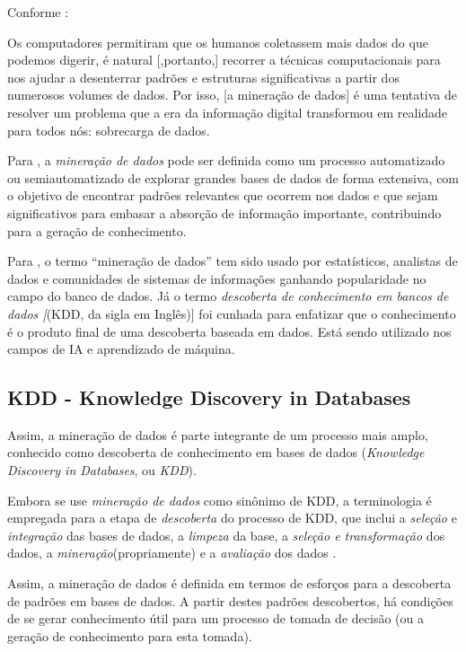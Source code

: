 Conforme :
\begin{citacao}
	 Os computadores permitiram que os humanos coletassem mais dados do que podemos digerir, é natural [,portanto,] recorrer a técnicas computacionais para nos ajudar a desenterrar padrões e estruturas significativas a partir dos numerosos volumes de dados. Por isso, [a mineração de dados] é uma tentativa de resolver um problema que a era da informação digital transformou em realidade para todos nós: sobrecarga de dados.
\end{citacao}

Para , a \textit{mineração de dados} pode ser definida como um processo automatizado ou semiautomatizado de explorar grandes bases de dados de forma extensiva, com o objetivo de encontrar padrões relevantes que ocorrem nos dados e que sejam significativos para embasar a absorção de informação importante, contribuindo para a geração de conhecimento. 

Para , o termo ``mineração de dados'' tem sido usado  por estatísticos, analistas de dados e comunidades de sistemas de informações ganhando popularidade no campo do banco de dados. Já o termo \textit{descoberta de conhecimento em bancos de dados [}(KDD, da sigla em Inglês)] foi cunhada para enfatizar que o conhecimento é o produto final de uma descoberta baseada em dados. Está sendo utilizado nos campos de IA e aprendizado de máquina.


\subsection{KDD - Knowledge Discovery in Databases}
Assim, a mineração de dados é parte integrante de um processo mais amplo, conhecido como descoberta de conhecimento em bases de dados (\textit{Knowledge Discovery in Databases}, ou \textit{KDD})\cite{fayyad1996}. 

Embora se use \textit{mineração de dados} como sinônimo de KDD, a terminologia é empregada para a etapa de \textit{descoberta}  do processo de KDD, que inclui a \textit{seleção} e \textit{integração} das bases de dados, a \textit{limpeza} da base, a \textit{seleção e transformação} dos dados, a \textit{mineração}(propriamente) e a \textit{avaliação} dos dados \cite{ferrari2017}\cite{Boscarioli2017}.

Assim, a mineração de dados  é definida em termos de esforços para a descoberta de padrões em bases de dados. A partir destes padrões descobertos, há condições de se gerar conhecimento útil para um processo de tomada de decisão (ou a geração de conhecimento para esta tomada).

